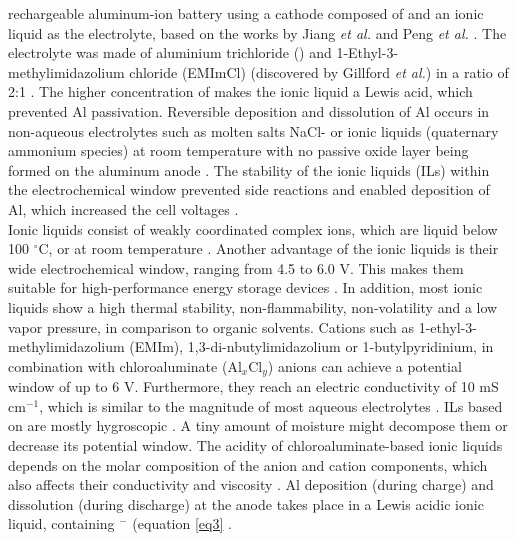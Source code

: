 rechargeable aluminum-ion battery using a cathode composed of  and an ionic liquid as the electrolyte, based on the works by Jiang \textit{et al.} and Peng \textit{et al.} \cite{paranthaman_transformational_2010, jiang_electrodeposition_2006,peng_investigation_2008}. The electrolyte was made of aluminium trichloride () and 1-Ethyl-3-methylimidazolium chloride (EMImCl) (discovered by Gillford \textit{et al.}) in a ratio of 2:1 \cite{gifford_aluminum/chlorine_1988}. The higher concentration of  makes the ionic liquid a Lewis acid, which prevented Al passivation. 
Reversible deposition and dissolution of Al occurs in non-aqueous electrolytes such as molten salts NaCl- or ionic liquids (quaternary ammonium species) at room temperature with no passive oxide layer being formed on the aluminum anode \cite{vestergaard_molten_1993,galinski_ionic_2006,elia_insights_2017}. The stability of the ionic liquids (ILs) within the electrochemical window prevented side reactions and enabled deposition of Al, which increased the cell voltages \cite{li_aluminum_2002}.\\ Ionic liquids consist of weakly coordinated complex ions, which are liquid below 100 $^{\circ}$C, or at room temperature \cite{hayes_structure_2015}. Another advantage of the ionic liquids is their wide electrochemical window, ranging from 4.5 to 6.0 V. This makes them suitable for high-performance energy storage devices \cite{wang_binder-free_2015}. In addition, most ionic liquids show a high thermal stability, non-flammability, non-volatility and a low vapor pressure, in comparison to organic solvents. Cations such as 1-ethyl-3-methylimidazolium (EMIm), 1,3-di-nbutylimidazolium or 1-butylpyridinium, in combination with chloroaluminate (Al$_x$Cl$_y$) anions can achieve a potential window of up to 6 V. Furthermore, they reach an electric conductivity of 10 mS cm$^{-1}$, which is similar to the magnitude of most aqueous electrolytes \cite{ngo_thermal_2000}. ILs based on  are mostly hygroscopic \cite{ueda_electroplating_2012}. A tiny amount of moisture might decompose them or decrease its potential window. The acidity of chloroaluminate-based ionic liquids depends on the molar composition of the anion and cation components, which also affects their conductivity and viscosity \cite{buzzeo_non-haloaluminate_2004}. 
Al deposition (during charge) and dissolution (during discharge) at the anode takes place in a Lewis acidic ionic liquid, containing $^-$ (equation \ref{eq3} \cite{galinski_ionic_2006}.

